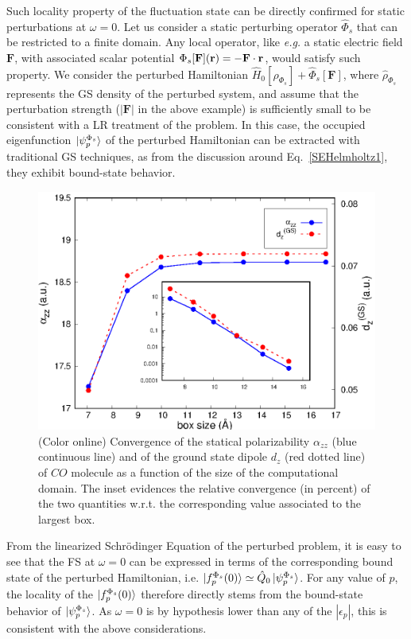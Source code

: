 \documentclass[reprint,aps,prb]{revtex4-1}
\renewcommand{\r}{{\bf r}}
\newcommand{\eps}{\epsilon}
\newcommand{\op}[1]{\hat {#1}}
\newcommand{\dm}{\op{\rho}}
\newcommand{\hnot}{\op{H}_0}
\begin{document}
Such locality property of the fluctuation state can be directly confirmed for static perturbations at $\omega=0$.
Let us consider a static perturbing operator $\op\Phi_s$ that can be restricted to a finite domain.
Any local operator, like \emph{e.g.} a static electric field $\mathbf F$, with associated scalar potential $\Phi_s[\mathbf F](\r) = -\mathbf F \cdot \r$, would satisfy such property.
We consider the perturbed Hamiltonian $\hnot[\dm_{\Phi_s}] + \op\Phi_s[\mathbf F]$, where $\dm_{\Phi_s}$ represents the GS density of the perturbed system, and assume that the
perturbation strength ($|\mathbf F|$ in the above example) is sufficiently small to be consistent with a LR treatment of the problem.
In this case, the occupied eigenfunction $\ket{\psi_p^{\Phi_s}}$ of the perturbed Hamiltonian can be extracted with traditional GS techniques,
as from the discussion around Eq.~\eqref{SEHelmholtz1}, they exhibit bound-state behavior.
\begin{figure}[t]
\includegraphics[scale=0.68]{Fig1_CO_statPolvsBox.eps}
\caption{\label{co_alphaStatic}(Color online) Convergence of the statical polarizability $\alpha_{zz}$ (blue continuous line) and of the ground state dipole $d_z$ (red dotted line)
of $CO$ molecule as a function of the size of the computational domain. The inset evidences the relative convergence (in percent) of the two quantities w.r.t. the corresponding value associated to the largest
box.}
\end{figure}

From the linearized Schr\"odinger Equation of the perturbed problem, it is easy to see that the FS at $\omega=0$ can be expressed
in terms of the corresponding bound state of the perturbed Hamiltonian, i.e.
$\ket{f_p^{\Phi_s}(0)} \simeq \op Q_0 \ket{\psi_p^{\Phi_s}}$.
For any value of $p$, the locality of the $\ket{f_p^{\Phi_s}(0)}$ therefore directly stems from the
bound-state behavior of $\ket{\psi_p^{\Phi_s}}$. As $\omega=0$ is by hypothesis
lower than any of the $|\eps_p|$, this is consistent with the above considerations.
\end{document}
